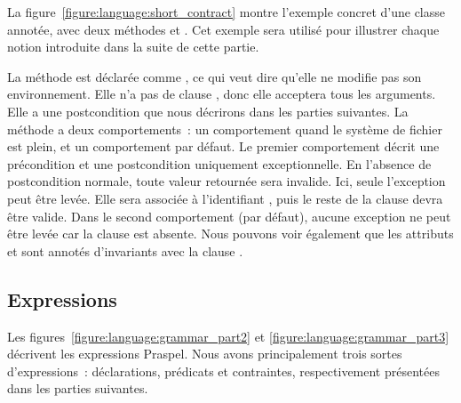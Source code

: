 \begin{example} La
figure~\ref{figure:language:short_contract} montre l'exem\-ple concret d'une
classe  annotée, avec deux méthodes  et
. Cet exemple sera utilisé pour illustrer chaque notion introduite
dans la suite de cette partie.

La méthode  est déclarée comme , ce qui veut dire
qu'elle ne modifie pas son environnement. Elle n'a pas de clause \arequires,
donc elle acceptera tous les arguments. Elle a une postcondition que nous
décrirons dans les parties suivantes. La méthode  a deux
comportements~: un comportement  quand le système de fichier est
plein, et un comportement par défaut. Le premier comportement décrit une
précondition et une postcondition uniquement exceptionnelle. En l'absence de
postcondition normale, toute valeur retournée sera invalide. Ici, seule
l'exception  peut être levée. Elle sera associée à
l'identifiant , puis le reste de la clause devra être valide. Dans le
second comportement (par défaut), aucune exception ne peut être levée car la
clause \athrowable est absente. Nous pouvons voir également que les attributs
 et  sont annotés d'invariants avec la clause
\ainvariant.

\end{example}

\subsection{Expressions}
\label{subsection:language:expressions}

Les figures~\ref{figure:language:grammar_part2} et
\ref{figure:language:grammar_part3} décrivent les expressions Praspel. Nous
avons principalement trois sortes d'expressions~: déclarations, prédicats et
contraintes, respectivement présentées dans les parties suivantes.

